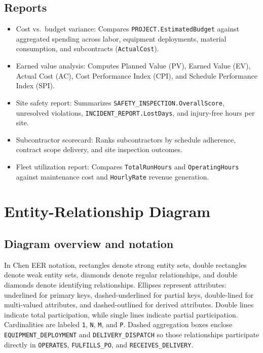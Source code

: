 \documentclass[a4paper,12pt]{report}
\providecommand{\tightlist}{%
  \setlength{\itemsep}{0pt}\setlength{\parskip}{0pt}}
\begin{document}
\section{Reports}\label{reports}

\begin{itemize}
\tightlist
\item
  Cost vs.~budget variance: Compares \texttt{PROJECT.\allowbreak{}EstimatedBudget} against aggregated spending across labor, equipment deployments, material consumption, and subcontracts (\allowbreak{}\texttt{ActualCost}).
\item
  Earned value analysis: Computes Planned Value (\allowbreak{}PV), Earned Value (\allowbreak{}EV), Actual Cost (\allowbreak{}AC), Cost Performance Index (\allowbreak{}CPI), and Schedule Performance Index (\allowbreak{}SPI).
\item
  Site safety report: Summarizes \texttt{SAFETY\_\allowbreak{}INSPECTION.\allowbreak{}OverallScore}, unresolved violations, \texttt{INCIDENT\_\allowbreak{}REPORT.\allowbreak{}LostDays}, and injury-free hours per site.
\item
  Subcontractor scorecard: Ranks subcontractors by schedule adherence, contract scope delivery, and site inspection outcomes.
\item
  Fleet utilization report: Compares \texttt{TotalRunHours} and \texttt{OperatingHours} against maintenance cost and \texttt{HourlyRate} revenue generation.
\end{itemize}

\chapter{Entity-Relationship Diagram}\label{entity-relationship-diagram}

\section{Diagram overview and notation}\label{diagram-overview-and-notation}

In Chen EER notation, rectangles denote strong entity sets, double rectangles denote weak entity sets, diamonds denote regular relationships, and double diamonds denote identifying relationships. Ellipses represent attributes: underlined for primary keys, dashed-underlined for partial keys, double-lined for multi-valued attributes, and dashed-outlined for derived attributes. Double lines indicate total participation, while single lines indicate partial participation. Cardinalities are labeled \texttt{1}, \texttt{N}, \texttt{M}, and \texttt{P}. Dashed aggregation boxes enclose \texttt{EQUIPMENT\_\allowbreak{}DEPLOYMENT} and \texttt{DELIVERY\_\allowbreak{}DISPATCH} so those relationships participate directly in \texttt{OPERATES}, \texttt{FULFILLS\_\allowbreak{}PO}, and \texttt{RECEIVES\_\allowbreak{}DELIVERY}.
\end{document}
